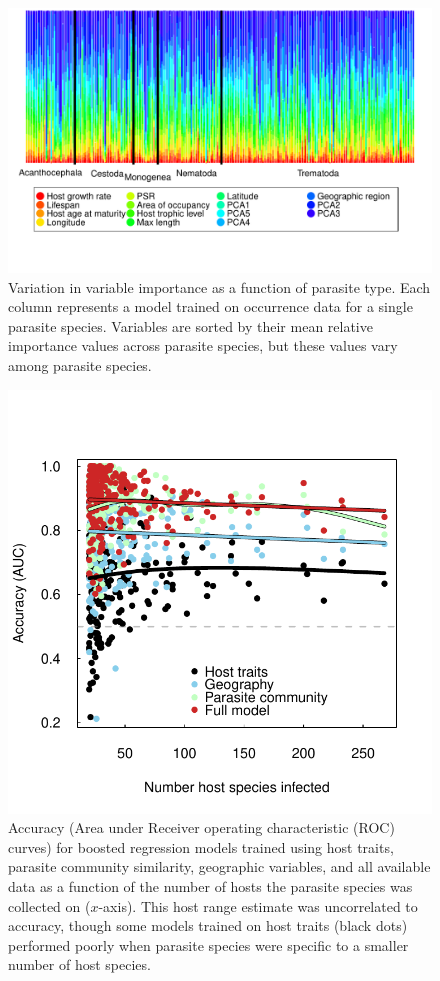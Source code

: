 \documentclass[12pt]{article}
\begin{document}
 
  
 
 \newpage
 \begin{figure}[h!]
  \includegraphics[width=\textwidth]{../Figures/parTypeColor.pdf}
  \caption{Variation in variable importance as a function of parasite type. Each column represents a model trained on occurrence data for a single parasite species. Variables are sorted by their mean relative importance values across parasite species, but these values vary among parasite species.}
 \label{fig:parType}
 \end{figure}


 
 
\begin{figure}[h]
  \includegraphics[width=\textwidth]{../Figures/hostNumAccuracy.pdf}
  \caption{Accuracy (Area under Receiver operating characteristic (ROC) curves) for boosted regression models trained using host traits, parasite community similarity, geographic variables, and all available data as a function of the number of hosts the parasite species was collected on ($x$-axis). This host range estimate was uncorrelated to accuracy, though some models trained on host traits (black dots) performed poorly when parasite species were specific to a smaller number of host species. }
 \label{fig:HostNum}
 \end{figure}

 
 
 
\end{document}
